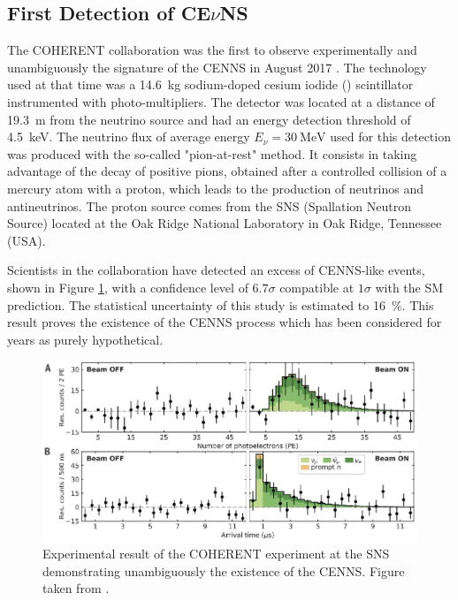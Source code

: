 \subsection{First Detection of CE$\nu$NS}

The COHERENT collaboration was the first to observe experimentally and unambiguously the signature of the CENNS in August 2017 \cite{Akimov:2017bs}.
The technology used at that time was a \SI{14.6}{\kg} sodium-doped cesium iodide () scintillator instrumented with photo-multipliers. The detector was located at a distance of \SI{19.3}{\m} from the neutrino source and had an energy detection threshold of \SI{4.5}{\kilo\eV}. The neutrino flux of average energy $E_{\nu} = \SI{30}{\mega\eV}$ used for this detection was produced with the so-called "pion-at-rest" method. It consists in taking advantage of the decay of positive pions, obtained after a controlled collision of a mercury atom with a proton, which leads to the production of neutrinos and antineutrinos. The proton source comes from the SNS (Spallation Neutron Source) located at the Oak Ridge National Laboratory in Oak Ridge, Tennessee (USA). 

Scientists in the collaboration have detected an excess of CENNS-like events, shown in Figure \ref{fig:coherent-result}, with a confidence level of $6.7\sigma$ compatible at $1\sigma$ with the SM prediction. The statistical uncertainty of this study is estimated to \SI{16}{\percent}. This result proves the existence of the CENNS process which has been considered for years as purely hypothetical.

\begin{figure}
\centering
\includegraphics [scale=1]{Figures/Introduction/coherent_result.pdf}
\caption{Experimental result of the COHERENT experiment at the SNS demonstrating unambiguously the existence of the CENNS. Figure taken from \cite{Akimov:2017bs}.}
\label{fig:coherent-result}
\end{figure}

